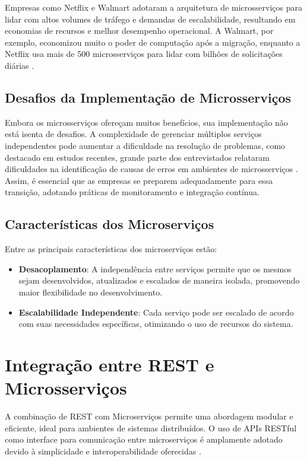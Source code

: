 \documentclass[12pt]{article}
\begin{document}
	
	Empresas como Netflix e Walmart adotaram a arquitetura de microsserviços para lidar com altos volumes de tráfego e demandas de escalabilidade, resultando em economias de recursos e melhor desempenho operacional. A Walmart, por exemplo, economizou muito o poder de computação após a migração, enquanto a Netflix usa mais de 500 microsserviços para lidar com bilhões de solicitações diárias \cite{castro2021}.
	
	\subsection{Desafios da Implementação de Microsserviços}
	
	Embora os microsserviços ofereçam muitos benefícios, sua implementação não está isenta de desafios. A complexidade de gerenciar múltiplos serviços independentes pode aumentar a dificuldade na resolução de problemas, como destacado em estudos recentes, grande parte dos entrevistados relataram dificuldades na identificação de causas de erros em ambientes de microsserviços \cite{castro2021}. Assim, é essencial que as empresas se preparem adequadamente para essa transição, adotando práticas de monitoramento e integração contínua.
	
	
	\subsection{Características dos Microserviços}
	Entre as principais características dos microserviços estão:
	\begin{itemize}
		\item \textbf{Desacoplamento}: A independência entre serviços permite que os mesmos sejam desenvolvidos, atualizados e escalados de maneira isolada, promovendo maior flexibilidade no desenvolvimento.
		\item \textbf{Escalabilidade Independente}: Cada serviço pode ser escalado de acordo com suas necessidades específicas, otimizando o uso de recursos do sistema.
	\end{itemize}
	
	\section{Integração entre REST e Microsserviços}
	
	A combinação de REST com Microserviços permite uma abordagem modular e eficiente, ideal para ambientes de sistemas distribuídos. O uso de APIs RESTful como interface para comunicação entre microserviços é amplamente adotado devido à simplicidade e interoperabilidade oferecidas \cite{newman2015}.
	
\end{document}

